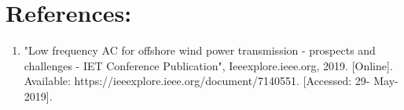 \section{\textbf{References:}}
\begin{enumerate}
\item "Low frequency AC for offshore wind power transmission - prospects and challenges - IET Conference Publication", Ieeexplore.ieee.org, 2019. [Online]. Available: https://ieeexplore.ieee.org/document/7140551. [Accessed: 29- May- 2019].
\end{enumerate}